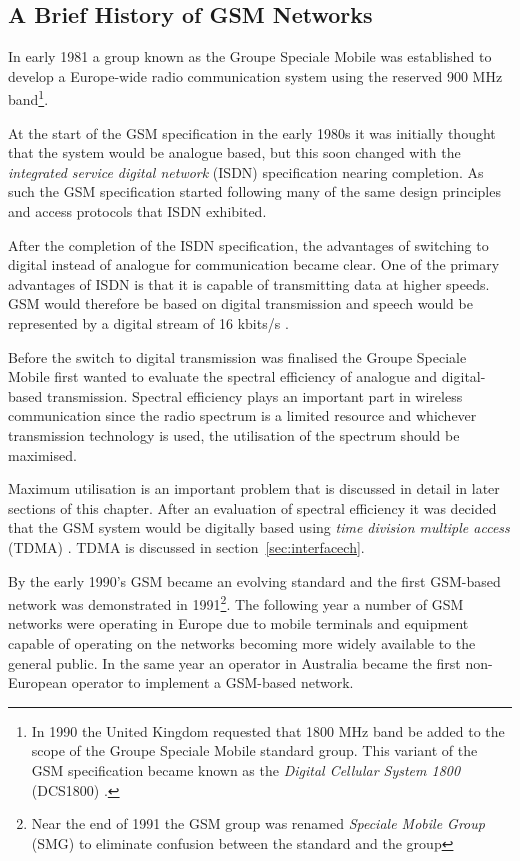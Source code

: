 \subsection{A Brief History of GSM Networks}
\label{sec:gsmhistory}
In early 1981 a group known as the Groupe Speciale Mobile was established to develop a Europe-wide radio communication system using the reserved 900 MHz band\footnote{In 1990 the United Kingdom requested that 1800 MHz band be added to the scope of the Groupe Speciale Mobile standard group. This variant of the GSM specification became known as the \emph{Digital Cellular System 1800} (DCS1800) \cite{GSM92,Karen2004}.}\cite{GSM92,Karen2004}.

At the start of the GSM specification in the early 1980s it was initially thought that the system would be analogue based, but this soon changed with the \emph{integrated service digital network} (ISDN) specification nearing completion. As such the GSM specification started following many of the same design principles and access protocols that ISDN exhibited\cite{GSM92}.

After the completion of the ISDN specification, the advantages of switching to digital instead of analogue for communication became clear. One of the primary advantages of ISDN is that it is capable of transmitting data at higher speeds. GSM would therefore be based on digital transmission and speech would be represented by a digital stream of 16 kbits/s \cite{GSM92}.

Before the switch to digital transmission was finalised the Groupe Speciale Mobile first wanted to evaluate the spectral efficiency of analogue and digital-based transmission\cite{GSM92}. Spectral efficiency plays an important part in wireless communication since the radio spectrum is a limited resource and whichever transmission technology is used, the utilisation of the spectrum should be maximised\cite{GSM92}. 

Maximum utilisation is an important problem that is discussed in detail in later sections of this chapter. After an evaluation of spectral efficiency it was decided that the GSM system would be digitally based using \emph{time division multiple access} (TDMA) \cite{GSM92,GSMSysEngin}. TDMA is discussed in section~\ref{sec:interfacech}.

By the early 1990’s GSM became an evolving standard and the first GSM-based network was demonstrated in 1991\footnote{Near the end of 1991 the GSM group was renamed \emph{Speciale Mobile Group} (SMG) to eliminate confusion between the standard and the group}\cite{GSMArchitectureProtocolsServices,Eisenblatter}. The following year a number of GSM networks were operating in Europe due to mobile terminals and equipment capable of operating on the networks becoming more widely available to the general public\cite{GSM92,Eisenblatter}. In the same year an operator in Australia became the first non-European operator to implement a GSM-based network\cite{Eisenblatter}.

